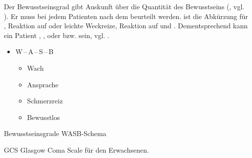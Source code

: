 {%
\label{topic:bewusstseinsstoerung-grade}
\label{topic:bewusstseinsgrad}
%
Der Bewusstseinsgrad gibt Auskunft über die Quantität des
Bewusstseins (, vgl.
). 
Er muss bei jedem Patienten nach dem
 beurteilt
werden. 
%
 ist die Abkürzung für 
,
Reaktion auf  oder
  leichte Weckreize,
Reaktion auf  und
. 
%
Dementsprechend kann ein Patient
, , 
oder   bzw.  sein, vgl.
.
}{
\begin{itemize}
  \item W\,--\,A\,--\,S\,--\,B
  \begin{itemize}
    \item Wach \dotfill  {}
    \item Ansprache \dotfill 
    \item Schmerzreiz \dotfill  {}
    \item Bewusstlos \dotfill  {}
  \end{itemize}
\end{itemize}
}{}{}{}


\TableWide
{Bewusstseinsgrade}%
{WASB-Schema}%
{\label{tab:bewusstseinsgrade-pam}}%
{}%
{}%
{{\protect}}%
{}%



%
%

\Table
{GCS}%
{Glasgow Coma Scale für den Erwachsenen.}%
{\label{tab:gcs-pam}}%
{}%
{}%
{{\protect}}%
{}%



